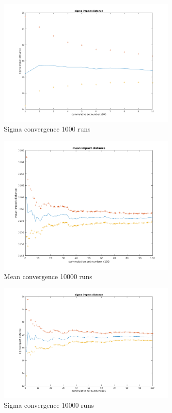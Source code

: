 \documentclass[12pt,letterpaper]{article}
\begin{document}
    \begin{figure}[!h] 
        \centering
        \includegraphics[width=0.8\textwidth]{../matlab/img/sigma.png}
        \caption{Sigma convergence 1000 runs}
        \label{fig:sigma}
    \end{figure}

    \begin{figure}[!h] 
        \centering
        \includegraphics[width=0.8\textwidth]{../matlab/img/mean10.png}
        \caption{Mean convergence 10000 runs}
        \label{fig:mean10}
    \end{figure}
    
    \begin{figure}[!h] 
        \centering
        \includegraphics[width=0.8\textwidth]{../matlab/img/sigma10.png}
        \caption{Sigma convergence 10000 runs}
        \label{fig:sigma10}
    \end{figure}
\end{document}
